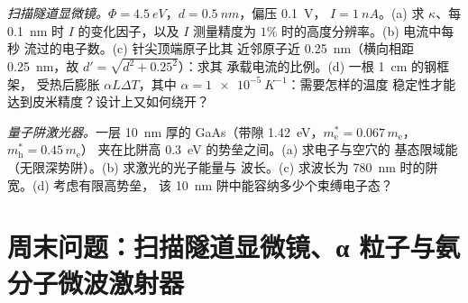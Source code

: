 \begin{exercise}[$\star\star\star$]\label{exo:b2:potential-wells-tunneling:11}
\emph{扫描隧道显微镜。}$\Phi = \qty{4.5}{eV}$，$d = \qty{0.5}{nm}$，偏压 \qty{0.1}{V}，
$I = \qty{1}{nA}$。(a) 求 $\kappa$、每 \qty{0.1}{nm} 时 $I$ 的变化因子，以及
$I$ 测量精度为 $1\%$ 时的高度分辨率。(b) 电流中每秒
流过的电子数。(c) 针尖顶端原子比其
近邻原子近 \qty{0.25}{nm}（横向相距 \qty{0.25}{nm}，故 $d' = \sqrt{d^2 + 0.25^2}$）：求其
承载电流的比例。(d) 一根 \qty{1}{cm} 的钢框架，
受热后膨胀 $\alpha L\Delta T$，其中 $\alpha = \qty{1e-5}{K^{-1}}$：需要怎样的温度
稳定性才能达到皮米精度？设计上又如何绕开？
\end{exercise}

\begin{exercise}[$\star\star\star$]\label{exo:b2:potential-wells-tunneling:12}
\emph{量子阱激光器。}一层 \qty{10}{nm} 厚的 GaAs（带隙
\qty{1.42}{eV}，$m_{\text{e}}^* = 0.067\,m_{\text{e}}$，$m_{\text{h}}^* = 0.45\,m_{\text{e}}$）
夹在比阱高 \qty{0.3}{eV} 的势垒之间。(a) 求电子与空穴的
基态限域能（无限深势阱）。(b) 求激光的光子能量与
波长。(c) 求波长为 \qty{780}{nm} 时的阱宽。(d) 考虑有限高势垒，
该 \qty{10}{nm} 阱中能容纳多少个束缚电子态？
\end{exercise}

\section{周末问题：扫描隧道显微镜、α 粒子与氨分子微波激射器}

